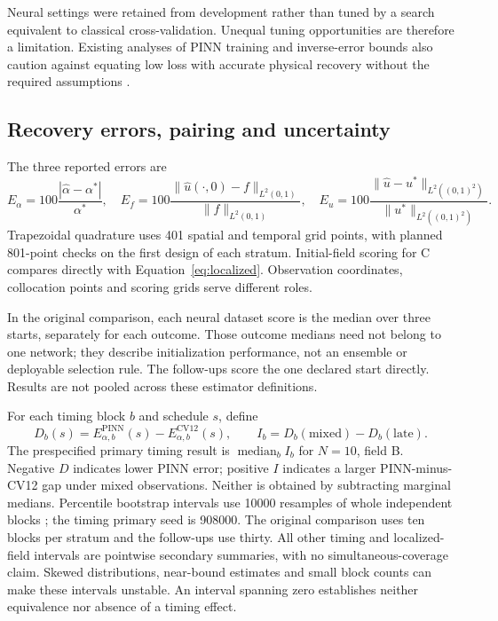 \documentclass[11pt,a4paper]{article}
\begin{document}
Neural settings were retained from development rather than tuned by a search equivalent to classical cross-validation. Unequal tuning opportunities are therefore a limitation. Existing analyses of PINN training and inverse-error bounds also caution against equating low loss with accurate physical recovery without the required assumptions \citep{ref045,ref046,ref043}.

\subsection{Recovery errors, pairing and uncertainty}
The three reported errors are
\begin{equation}
 E_\alpha=100\frac{|\widehat\alpha-\alpha^*|}{\alpha^*},\quad
 E_f=100\frac{\|\widehat u(\cdot,0)-f\|_{L^2(0,1)}}{\|f\|_{L^2(0,1)}},\quad
 E_u=100\frac{\|\widehat u-u^*\|_{L^2((0,1)^2)}}{\|u^*\|_{L^2((0,1)^2)}}.
\end{equation}
Trapezoidal quadrature uses 401 spatial and temporal grid points, with planned 801-point checks on the first design of each stratum. Initial-field scoring for C compares directly with Equation~\eqref{eq:localized}. Observation coordinates, collocation points and scoring grids serve different roles.

In the original comparison, each neural dataset score is the median over three starts, separately for each outcome. Those outcome medians need not belong to one network; they describe initialization performance, not an ensemble or deployable selection rule. The follow-ups score the one declared start directly. Results are not pooled across these estimator definitions.

For each timing block $b$ and schedule $s$, define
\begin{equation}
 D_b(s)=E_{\alpha,b}^{\mathrm{PINN}}(s)-E_{\alpha,b}^{\mathrm{CV12}}(s),\qquad
 I_b=D_b(\mathrm{mixed})-D_b(\mathrm{late}).
\label{eq:interaction}
\end{equation}
The prespecified primary timing result is $\operatorname{median}_b I_b$ for $N=10$, field B. Negative $D$ indicates lower PINN error; positive $I$ indicates a larger PINN-minus-CV12 gap under mixed observations. Neither is obtained by subtracting marginal medians. Percentile bootstrap intervals use 10000 resamples of whole independent blocks \citep{ref081,ref083}; the timing primary seed is 908000. The original comparison uses ten blocks per stratum and the follow-ups use thirty. All other timing and localized-field intervals are pointwise secondary summaries, with no simultaneous-coverage claim. Skewed distributions, near-bound estimates and small block counts can make these intervals unstable. An interval spanning zero establishes neither equivalence nor absence of a timing effect.
\end{document}

